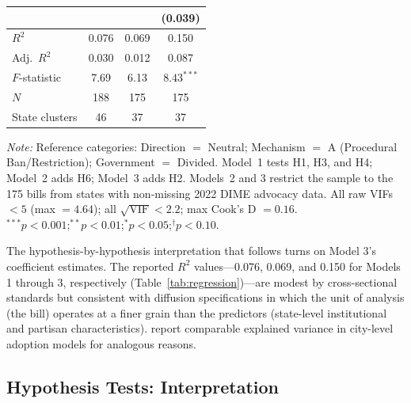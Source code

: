 \begin{table}[htbp]
\begin{tabular}{@{}lccc@{}}
  & & & (0.039) \\[6pt]
\midrule
$R^2$          & 0.076 & 0.069 & 0.150 \\
Adj.\ $R^2$   & 0.030 & 0.012 & 0.087 \\
$F$-statistic  & 7.69  & 6.13  & $8.43^{***}$ \\
$N$            & 188   & 175   & 175 \\
State clusters & 46    & 37    & 37 \\
\bottomrule
\end{tabular}
\par\medskip
\parbox{0.92\textwidth}{\footnotesize
\textit{Note:} Reference categories: Direction $=$ Neutral; Mechanism $=$ A (Procedural Ban/Restriction); Government $=$ Divided. Model~1 tests H1, H3, and H4; Model~2 adds H6; Model~3 adds H2. Models~2 and 3 restrict the sample to the 175 bills from states with non-missing 2022 DIME advocacy data. All raw VIFs $< 5$ (max $= 4.64$); all $\sqrt{\mathrm{VIF}} < 2.2$; max Cook's D $= 0.16$.\\[2pt]
$^{***}p < 0.001$;\enspace $^{**}p < 0.01$;\enspace $^{*}p < 0.05$;\enspace $^{\dagger}p < 0.10$.}
\end{table}

The hypothesis-by-hypothesis interpretation that follows turns on Model 3's coefficient estimates. The reported $R^{2}$ values---0.076, 0.069, and 0.150 for Models 1 through 3, respectively (Table~\ref{tab:regression})---are modest by cross-sectional standards but consistent with diffusion specifications in which the unit of analysis (the bill) operates at a finer grain than the predictors (state-level institutional and partisan characteristics). \textcite{shipanMechanismsPolicyDiffusion2008a} report comparable explained variance in city-level adoption models for analogous reasons.


\subsection{Hypothesis Tests: Interpretation}
\label{sec:hypotheses}

